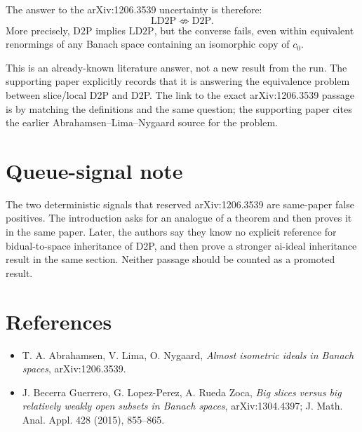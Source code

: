 \documentclass[11pt]{article}
\newcommand{\LDTP}{\mathrm{LD2P}}
\newcommand{\DTP}{\mathrm{D2P}}
\newcommand{\cnull}{c_0}
\begin{document}
The answer to the arXiv:1206.3539 uncertainty is therefore:
\[
  \LDTP \not\Longleftrightarrow \DTP.
\]
More precisely, \(\DTP\) implies \(\LDTP\), but the converse fails, even
within equivalent renormings of any Banach space containing an isomorphic copy
of \(\cnull\).

This is an already-known literature answer, not a new result from the run.
The supporting paper explicitly records that it is answering the equivalence
problem between slice/local D2P and D2P. The link to the exact
arXiv:1206.3539 passage is by matching the definitions and the same question;
the supporting paper cites the earlier Abrahamsen--Lima--Nygaard source for
the problem.

\section*{Queue-signal note}

The two deterministic signals that reserved arXiv:1206.3539 are same-paper
false positives. The introduction asks for an analogue of a theorem and then
proves it in the same paper. Later, the authors say they know no explicit
reference for bidual-to-space inheritance of D2P, and then prove a stronger
ai-ideal inheritance result in the same section. Neither passage should be
counted as a promoted result.

\section*{References}

\sloppy
\begin{itemize}
\item T. A. Abrahamsen, V. Lima, O. Nygaard, \emph{Almost isometric ideals in
Banach spaces}, arXiv:1206.3539.
\item J. Becerra Guerrero, G. Lopez-Perez, A. Rueda Zoca, \emph{Big slices
versus big relatively weakly open subsets in Banach spaces}, arXiv:1304.4397;
J. Math. Anal. Appl. 428 (2015), 855--865.
\end{itemize}
\end{document}
